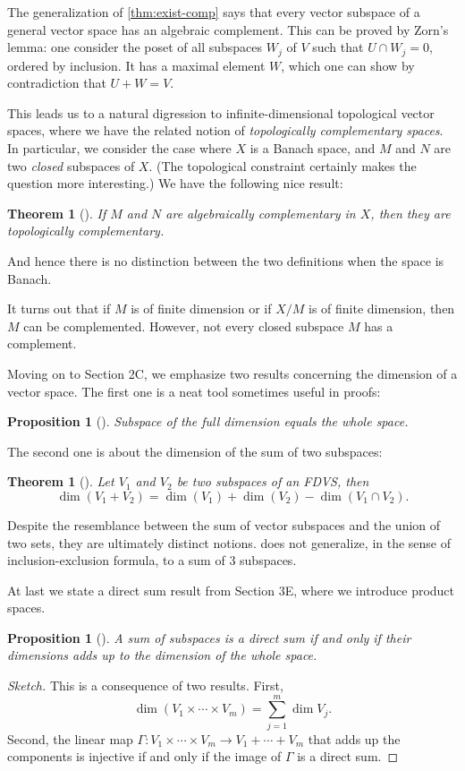 \documentclass[10pt]{article}
\numberwithin{equation}{section}
\theoremstyle{plain-star}
\newtheorem{thm}[equation]{Theorem}
\newtheorem*{thm*}{Theorem}
\newtheorem{prop}[equation]{Proposition}
\theoremstyle{definition-star}
\theoremstyle{remark-star}
\newenvironment{sketch}[1][Sketch]{\begin{proof}[#1]\renewcommand*{\qedsymbol}{$\triangle$}}{\end{proof}}
\theoremstyle{plain-star}
\begin{document}
The generalization of \cref{thm:exist-comp} says that every vector subspace of a general vector space has an algebraic complement. This can be proved by Zorn's lemma: one consider the poset of all subspaces $W_j$ of $V$ such that $U \cap W_j = {0}$, ordered by inclusion. It has a maximal element $W$, which one can show by contradiction that $U + W = V$.

This leads us to a natural digression to infinite-dimensional topological vector spaces, where we have the related notion of \emph{topologically complementary spaces}. In particular, we consider the case where $X$ is a Banach space, and $M$ and $N$ are two \emph{closed} subspaces of $X$. (The topological constraint certainly makes the question more interesting.) We have the following nice result: 
\begin{thm*}[{\cite[Theorem~13.1]{conway2007func}}]
    If $M$ and $N$ are algebraically complementary in $X$, then they are topologically complementary.
\end{thm*}
And hence there is no distinction between the two definitions when the space is Banach.

It turns out that if $M$ is of finite dimension or if $X/M$ is of finite dimension, then $M$ can be complemented. However, not every closed subspace $M$ has a complement.

Moving on to Section 2C, we emphasize two results concerning the dimension of a vector space. The first one is a neat tool sometimes useful in proofs: 
\begin{prop}[{\cite[2.39]{axler2024}}]
    Subspace of the full dimension equals the whole space.
\end{prop}
The second one is about the dimension of the sum of two subspaces: 
\begin{thm}[{\cite[2.43]{axler2024}}] \label{thm:sum-dim-two-spaces}
    Let $V_1$ and $V_2$ be two subspaces of an FDVS, then \[
        \dim(V_1+V_2) = \dim(V_1) + \dim(V_2) - \dim(V_1 \cap V_2).
    \]
\end{thm}
Despite the resemblance between the sum of vector subspaces and the union of two sets, they are ultimately distinct notions.  does not generalize, in the sense of inclusion-exclusion formula, to a sum of $3$ subspaces.

At last we state a direct sum result from Section 3E, where we introduce product spaces.
\begin{prop}[{\cite[3.94]{axler2024}}]
    A sum of subspaces is a direct sum if and only if their dimensions adds up to the dimension of the whole space.
\end{prop}
\begin{sketch}
    This is a consequence of two results. First, \[
        \dim(V_1 \times \dotsb \times V_m) = \sum_{j=1}^m \dim V_j.
    \] Second, the linear map $\Gamma\colon V_1 \times \dotsb \times V_m \to V_1 + \dotsb + V_m$ that adds up the components is injective if and only if the image of $\Gamma$ is a direct sum.
\end{sketch}
\end{document}
